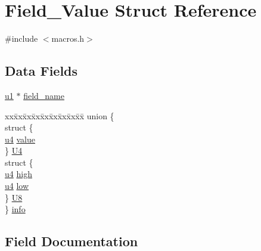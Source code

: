 \hypertarget{struct_field___value}{}\section{Field\+\_\+\+Value Struct Reference}
\label{struct_field___value}


{\ttfamily \#include $<$macros.\+h$>$}

\subsection*{Data Fields}
\begin{DoxyCompactItemize}
\item 
\hyperlink{macros_8h_ad9f4cdb6757615aae2fad89dab3c5470}{u1} $\ast$ \hyperlink{struct_field___value_a95bfdfcea960d54a8e8a39e5b13a5c40}{field\+\_\+name}
\item 
\begin{tabbing}
xx\=xx\=xx\=xx\=xx\=xx\=xx\=xx\=xx\=\kill
union \{\\
\>struct \{\\
\>\>\hyperlink{macros_8h_ae5be1f726785414dd1b77d60df074c9d}{u4} \hyperlink{struct_field___value_a2f14c1ab2c4449bdb44c2a134ad70787}{value}\\
\>\} \hyperlink{struct_field___value_a3e590451832f4fc45a7cefa138a649fc}{U4}\\
\>struct \{\\
\>\>\hyperlink{macros_8h_ae5be1f726785414dd1b77d60df074c9d}{u4} \hyperlink{struct_field___value_a8f41bf429ff91607c22ff70c83f1976b}{high}\\
\>\>\hyperlink{macros_8h_ae5be1f726785414dd1b77d60df074c9d}{u4} \hyperlink{struct_field___value_aceb641bac42a71fef1aea1b4b9762aee}{low}\\
\>\} \hyperlink{struct_field___value_a1141cabc0fc1f5c068ce2e59e717dd23}{U8}\\
\} \hyperlink{struct_field___value_a9625e34037582628be60345423c74274}{info}\\

\end{tabbing}\end{DoxyCompactItemize}


\subsection{Field Documentation}
\hypertarget{struct_field___value_a95bfdfcea960d54a8e8a39e5b13a5c40}{}
